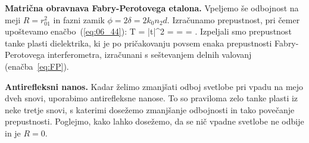 \begin{example}{\bf Matrična obravnava Fabry-Perotovega etalona.}
Vpeljemo še odbojnost na meji $R = r_{01}^2$ in fazni zamik 
$\phi = 2 \delta = 2 k_0 n_2 d$. Izračunamo prepustnost, pri čemer upoštevamo 
enačbo~(\ref{eq:06_44}):
\beq
T = |t|^2 =  = =
.
\label{eq:06_69}
\eeq
Izpeljali smo prepustnost 
tanke plasti dielektrika, ki je po pričakovanju povsem enaka prepustnosti 
Fabry-Perotovega interferometra, izračunani s seštevanjem delnih valovanj (enačba~\ref{eq:FP}).

\end{example}

\begin{example}{\bf Antirefleksni nanos.}
Kadar želimo zmanjšati odboj svetlobe pri vpadu na mejo dveh snovi, uporabimo
antirefleksne nanose. To so praviloma zelo tanke plasti iz neke tretje snovi, 
s katerimi dosežemo zmanjšanje odbojnosti in tako povečanje prepustnosti. Poglejmo, 
kako lahko dosežemo, da se nič vpadne svetlobe ne odbije in je $R=0$. 


\end{example}
